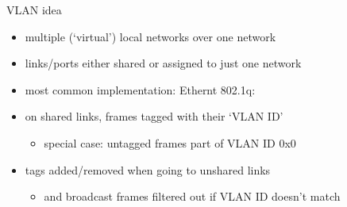 \begin{frame}{VLAN idea}
    \begin{itemize}
    \item multiple (`virtual') local networks over one network
    \item links/ports either shared or assigned to just one network
    \item most common implementation: Ethernt 802.1q:
    \vspace{.5cm}
    \item on shared links, frames tagged with their `VLAN ID'
        \begin{itemize}
        \item special case: untagged frames part of VLAN ID 0x0
        \end{itemize}
    \item tags added/removed when going to unshared links
        \begin{itemize}
        \item and broadcast frames filtered out if VLAN ID doesn't match
        \end{itemize}
    \end{itemize}
\end{frame}

